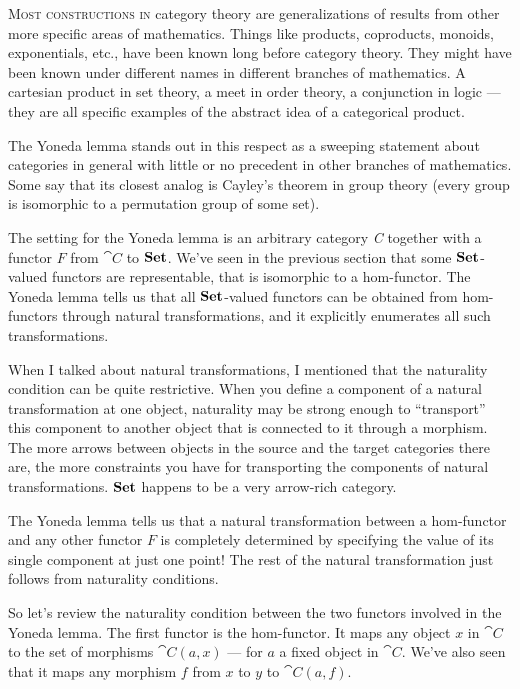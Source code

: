 \lettrine[lhang=0.17]{M}{ost constructions in} category theory are generalizations of results
from other more specific areas of mathematics. Things like products,
coproducts, monoids, exponentials, etc., have been known long before
category theory. They might have been known under different names in
different branches of mathematics. A cartesian product in set theory, a
meet in order theory, a conjunction in logic --- they are all specific
examples of the abstract idea of a categorical product.

The Yoneda lemma stands out in this respect as a sweeping statement
about categories in general with little or no precedent in other
branches of mathematics. Some say that its closest analog is Cayley's
theorem in group theory (every group is isomorphic to a permutation
group of some set).

The setting for the Yoneda lemma is an arbitrary category \emph{C}
together with a functor $F$ from $\cat{C}$ to $\mathbf{Set}$. We've
seen in the previous section that some $\mathbf{Set}$-valued functors are
representable, that is isomorphic to a hom-functor. The Yoneda lemma
tells us that all $\mathbf{Set}$-valued functors can be obtained from
hom-functors through natural transformations, and it explicitly
enumerates all such transformations.

When I talked about natural transformations, I mentioned that the
naturality condition can be quite restrictive. When you define a
component of a natural transformation at one object, naturality may be
strong enough to ``transport'' this component to another object that is
connected to it through a morphism. The more arrows between objects in
the source and the target categories there are, the more constraints you
have for transporting the components of natural transformations.
$\mathbf{Set}$ happens to be a very arrow-rich category.

The Yoneda lemma tells us that a natural transformation between a
hom-functor and any other functor $F$ is completely determined by
specifying the value of its single component at just one point! The rest
of the natural transformation just follows from naturality conditions.

So let's review the naturality condition between the two functors
involved in the Yoneda lemma. The first functor is the hom-functor. It
maps any object $x$ in $\cat{C}$ to the set of morphisms
$\cat{C}(a, x)$ --- for $a$ a fixed object in $\cat{C}$. We've
also seen that it maps any morphism $f$ from $x$ to
$y$ to $\cat{C}(a, f)$.

